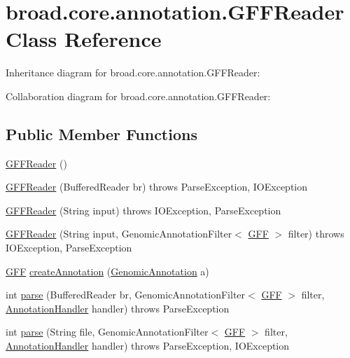\hypertarget{classbroad_1_1core_1_1annotation_1_1_g_f_f_reader}{\section{broad.\+core.\+annotation.\+G\+F\+F\+Reader Class Reference}
\label{classbroad_1_1core_1_1annotation_1_1_g_f_f_reader}
}


Inheritance diagram for broad.\+core.\+annotation.\+G\+F\+F\+Reader\+:


Collaboration diagram for broad.\+core.\+annotation.\+G\+F\+F\+Reader\+:
\subsection*{Public Member Functions}
\begin{DoxyCompactItemize}
\item 
\hyperlink{classbroad_1_1core_1_1annotation_1_1_g_f_f_reader_ad8129ce36c3a248837664d14a12e07d2}{G\+F\+F\+Reader} ()
\item 
\hyperlink{classbroad_1_1core_1_1annotation_1_1_g_f_f_reader_a8895a442b5a441c39d55d412a11292e6}{G\+F\+F\+Reader} (Buffered\+Reader br)  throws Parse\+Exception, I\+O\+Exception 
\item 
\hyperlink{classbroad_1_1core_1_1annotation_1_1_g_f_f_reader_ac5e40ca3193905823e32a67a1c8dcb46}{G\+F\+F\+Reader} (String input)  throws I\+O\+Exception, Parse\+Exception 
\item 
\hyperlink{classbroad_1_1core_1_1annotation_1_1_g_f_f_reader_aebf0116a2a32434f6989f7605365ea9b}{G\+F\+F\+Reader} (String input, Genomic\+Annotation\+Filter$<$ \hyperlink{classbroad_1_1core_1_1annotation_1_1_g_f_f}{G\+F\+F} $>$ filter)  throws I\+O\+Exception, Parse\+Exception 
\item 
\hyperlink{classbroad_1_1core_1_1annotation_1_1_g_f_f}{G\+F\+F} \hyperlink{classbroad_1_1core_1_1annotation_1_1_g_f_f_reader_a904ec7132145acee82ad588a7220bc9c}{create\+Annotation} (\hyperlink{interfacebroad_1_1core_1_1annotation_1_1_genomic_annotation}{Genomic\+Annotation} a)
\item 
int \hyperlink{classbroad_1_1core_1_1annotation_1_1_g_f_f_reader_a91880f79e9d06dc916dfbf40fba59182}{parse} (Buffered\+Reader br, Genomic\+Annotation\+Filter$<$ \hyperlink{classbroad_1_1core_1_1annotation_1_1_g_f_f}{G\+F\+F} $>$ filter, \hyperlink{interfacebroad_1_1core_1_1annotation_1_1_annotation_handler}{Annotation\+Handler} handler)  throws Parse\+Exception 
\item 
int \hyperlink{classbroad_1_1core_1_1annotation_1_1_g_f_f_reader_a85ddfcb99b8a938fc53d96ca1499d932}{parse} (String file, Genomic\+Annotation\+Filter$<$ \hyperlink{classbroad_1_1core_1_1annotation_1_1_g_f_f}{G\+F\+F} $>$ filter, \hyperlink{interfacebroad_1_1core_1_1annotation_1_1_annotation_handler}{Annotation\+Handler} handler)  throws Parse\+Exception, I\+O\+Exception 
\end{DoxyCompactItemize}



